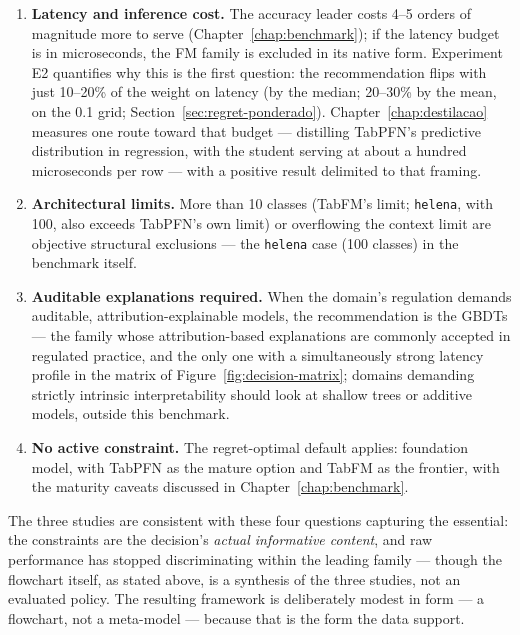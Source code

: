 \begin{enumerate}
  \item \textbf{Latency and inference cost.} The accuracy leader
    costs 4--5 orders of magnitude more to serve
    (Chapter~\ref{chap:benchmark}); if the latency budget is in
    microseconds, the FM family is excluded in its native form.
    Experiment E2 quantifies why this is the first question: the
    recommendation flips with just 10--20\% of the weight on latency
    (by the median; 20--30\% by the mean, on the 0.1 grid;
    Section~\ref{sec:regret-ponderado}).
    Chapter~\ref{chap:destilacao} measures one route toward that
    budget --- distilling TabPFN's predictive distribution in
    regression, with the student serving at about a hundred microseconds
    per row --- with a positive result delimited to that framing.
  \item \textbf{Architectural limits.} More than 10 classes (TabFM's
    limit; \texttt{helena}, with 100, also exceeds TabPFN's own
    limit) or overflowing the context limit are objective structural
    exclusions --- the \texttt{helena} case (100 classes) in the
    benchmark itself.
  \item \textbf{Auditable explanations required.} When the
    domain's regulation demands auditable, attribution-explainable
    models, the recommendation is the GBDTs --- the family whose
    attribution-based explanations are commonly accepted in
    regulated practice, and the only one with a simultaneously
    strong latency profile in the matrix of
    Figure~\ref{fig:decision-matrix}; domains demanding strictly
    intrinsic interpretability should look at shallow trees or
    additive models, outside this benchmark.
  \item \textbf{No active constraint.} The regret-optimal default
    applies: foundation model, with TabPFN \citep{hollmann2025} as
    the mature option and TabFM \citep{tabfm2026} as the frontier,
    with the maturity caveats discussed in
    Chapter~\ref{chap:benchmark}.
\end{enumerate}

The three studies are consistent with these four questions capturing
the essential: the constraints are the decision's \emph{actual
informative content}, and raw performance has stopped discriminating
within the leading family --- though the flowchart itself, as stated
above, is a synthesis of the three studies, not an evaluated
policy. The resulting framework is deliberately
modest in form --- a flowchart, not a meta-model --- because that is
the form the data support.

